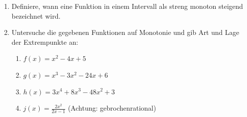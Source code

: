 \begin{enumerate}
	\item Definiere, wann eine Funktion in einem Intervall als streng monoton steigend bezeichnet wird.
	\item Untersuche die gegebenen Funktionen auf Monotonie und gib Art und Lage der Extrempunkte an:
	\begin{multicols}{2}
		\begin{enumerate}
			\item $f(x)=x^2-4x+5$
			\item $g(x)=x^3-3x^2-24x+6$
			\item $h(x)=3x^4+8x^3-48x^2+3$
			\item $j(x)=\frac{2x^2}{2x-1}$ (Achtung: gebrochenrational)
		\end{enumerate}
	\end{multicols}
\end{enumerate}
